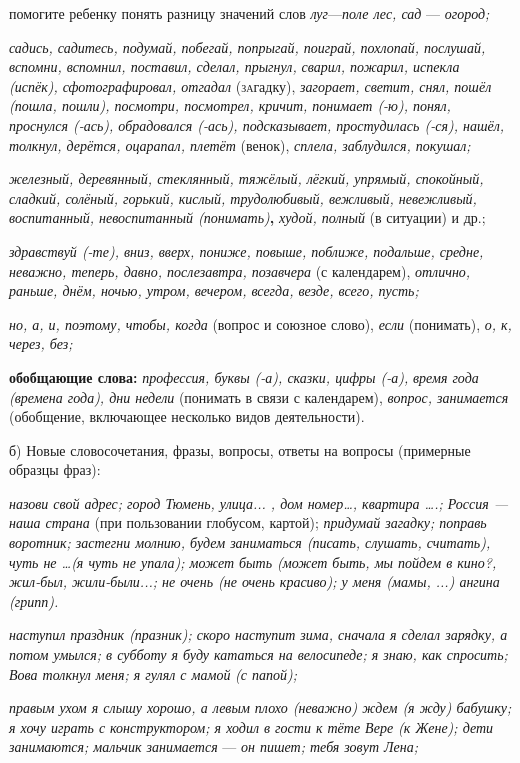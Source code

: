 \documentclass[a5paper]{book}
\renewcommand{\emph}[1]{\textit{#1}}
\begin{document}
помогите ребенку понять разницу значений слов \emph{луг}---\emph{поле
лес, сад} --- \emph{огород;}

\emph{садись, садитесь, подумай, побегай, попрыгай, поиграй, похлопай,
послушай, вспомни, вспомнил, поставил, сделал, прыгнул,} \emph{сварил,
пожарил, испекла (испёк), сфотографировал, отгадал} (\textsc{за}гадку),
\emph{загорает, светит, снял, пошёл (пошла, пошли), посмотри, посмотрел,
кричит, понимает (-ю), понял, проснулся (-ась), обрадовался (-ась),
подсказывает, простудилась (-ся), нашёл, толкнул, дерётся, оцарапал,
плетёт} (венок), \emph{сплела, заблудился, покушал;}

\emph{железный, деревянный, стеклянный, тяжёлый, лёгкий, упрямый,
спокойный, сладкий, солёный, горький, кислый, трудолюбивый, вежливый,
невежливый, воспитанный, невоспитанный (понимать)}\textbf{,}
\emph{худой, полный} (в ситуации) и др.;

\emph{здравствуй (-те), вниз, вверх, пониже, повыше, поближе, подальше,
средне, неважно, теперь, давно, послезавтра, позавчера} (с календарем),
\emph{отлично, раньше, днём, ночью, утром, вечером, всегда, везде,
всего, пусть;}

\emph{но, а, и, поэтому, чтобы, когда} (вопрос и союзное слово),
\emph{если} (понимать), \emph{о, к, через, без;}

\textbf{обобщающие слова:} \emph{профессия, буквы (-а), сказки, цифры
(-а),} \emph{время года (времена года), дни недели} (понимать в связи с
календарем), \emph{вопрос, занимается} (обобщение, включающее несколько
видов деятельности).

б) Новые словосочетания, фразы, вопросы, ответы на вопросы (примерные
образцы фраз):

\emph{назови свой адрес; город Тюмень, улица... , дом номер\ldots,
квартира \ldots.; Россия --- наша страна} (при пользовании глобусом,
картой); \emph{придумай загадку; поправь воротник; застегни молнию,
будем заниматься (писать, слушать, считать), чуть не \ldots(я чуть не
упала); может быть (может быть, мы пойдем в кино?, жил-был,
жили-были...; не очень (не очень красиво); у меня (мамы, ...) ангина
(грипп).}

\emph{наступил праздник (празник); скоро наступит зима, сначала я сделал
зарядку, а потом умылся; в субботу я буду кататься на велосипеде; я
знаю, как спросить; Вова толкнул меня; я гулял с мамой} \emph{(с
папой);}

\emph{правым ухом я слышу хорошо, а левым плохо (неважно) ждем (я жду)
бабушку; я хочу играть с конструктором; я ходил в гости к тёте Вере (к
Жене); дети занимаются; мальчик занимается} --- \emph{он пишет; тебя
зовут Лена;}
\end{document}
